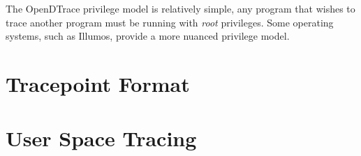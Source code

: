 The OpenDTrace privilege model is relatively simple, any program that
wishes to trace another program must be running with \emph{root}
privileges.  Some operating systems, such as Illumos, provide a more
nuanced privilege model.

\section{Tracepoint Format}
\label{sec:tracepoint-format}

\section{User Space Tracing}
\label{sec:user-space}

